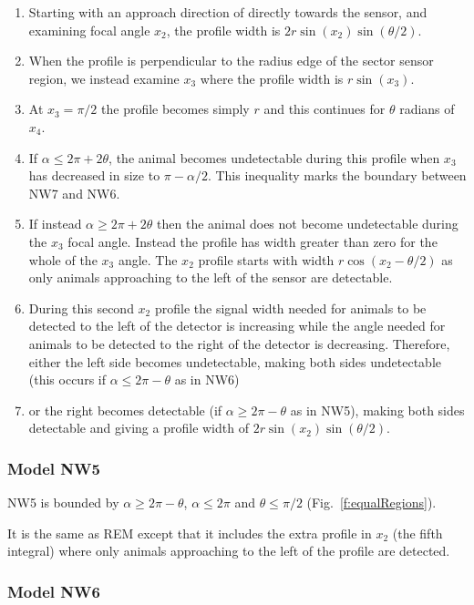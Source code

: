 \begin{enumerate}
\item Starting with an approach direction of directly towards the sensor, and examining focal angle $x_2$, the profile width is $2r\sin(x_2)\sin(\theta/2)$. 
\item When the profile is perpendicular to the radius edge of the sector sensor region, we instead examine $x_3$ where the profile width is $r\sin(x_3)$.
\item At $x_3=\pi/2$ the profile becomes simply $r$ and this continues for $\theta $ radians of $x_4$. 
\item If $\alpha \le 2\pi + 2\theta$, the animal becomes undetectable during this profile when  $x_3$ has decreased in size to $\pi - \alpha/2$. This inequality marks the boundary between NW7 and NW6. 
\item If instead $\alpha \ge 2\pi + 2\theta$ then the animal does not become undetectable during the $x_3$ focal angle. Instead the profile has width greater than zero for the whole of the $x_3$ angle. The $x_2$ profile starts with width $r\cos(x_2 - \theta/2)$ as only animals approaching to the left of the sensor are detectable. 
\item During this second $x_2$ profile the signal width needed for animals to be detected to the left of the detector is increasing while the angle needed for animals to be detected to the right of the detector is decreasing. Therefore, either the left side becomes undetectable, making both sides undetectable (this occurs if $\alpha \le 2\pi - \theta$ as in NW6) \item or the right becomes detectable (if $\alpha \ge 2\pi - \theta$ as in NW5), making both sides detectable and giving a profile width of $2r\sin(x_2)\sin(\theta/2)$.
\end{enumerate}


\subsubsection{Model NW5} \label{NW5}

NW5 is bounded by $\alpha \ge 2\pi - \theta$, $\alpha \le 2\pi$ and $\theta \le \pi/2$ (Fig.~\ref{f:equalRegions}).

It is the same as REM except that it includes the extra profile in $x_2$ (the fifth integral) where only animals approaching to the left of the profile are detected.



\subsubsection{Model NW6} \label{NW6}

